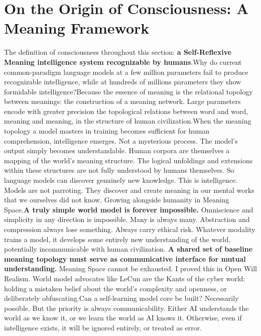 \documentclass[11pt]{article}
\renewcommand{\\}[1][\mynewlineskip]{\oldnewline[#1]}
\begin{document}
\section{On the Origin of Consciousness: A Meaning Framework}
The definition of consciousness throughout this section: \textbf{a Self-Reflexive Meaning intelligence system recognizable by humans}.\\
Why do current common-paradigm language models at a few million parameters fail to produce recognizable intelligence, while at hundreds of millions parameters they show formidable intelligence?\\
Because the essence of meaning is the relational topology between meanings: the construction of a meaning network. Large parameters encode with greater precision the topological relations between word and word, meaning and meaning, in the structure of human civilization.\\
When the meaning topology a model masters in training becomes sufficient for human comprehension, intelligence emerges. Not a mysterious process. The model's output simply becomes understandable. Human corpora are themselves a mapping of the world's meaning structure. The logical unfoldings and extensions within these structures are not fully understood by humans themselves. So language models can discover genuinely new knowledge. This is intelligence. Models are not parroting. They discover and create meaning in our mental works that we ourselves did not know. Growing alongside humanity in Meaning Space.\\
\textbf{A truly simple world model is forever impossible.} Omniscience and simplicity in any direction is impossible. Many is always many. Abstraction and compression always lose something. Always carry ethical risk. Whatever modality trains a model, it develops some entirely new understanding of the world, potentially incommunicable with human civilization. \textbf{A shared set of baseline meaning topology must serve as communicative interface for mutual understanding.} Meaning Space cannot be exhausted. I proved this in Open Will Realism. World model advocates like LeCun are the Kants of the cyber world: holding a mistaken belief about the world's complexity and openness, or deliberately obfuscating.\\
Can a self-learning model core be built? Necessarily possible. But the priority is always communicability. Either AI understands the world as we know it, or we learn the world as AI knows it. Otherwise, even if intelligence exists, it will be ignored entirely, or treated as error.\\
\end{document}
